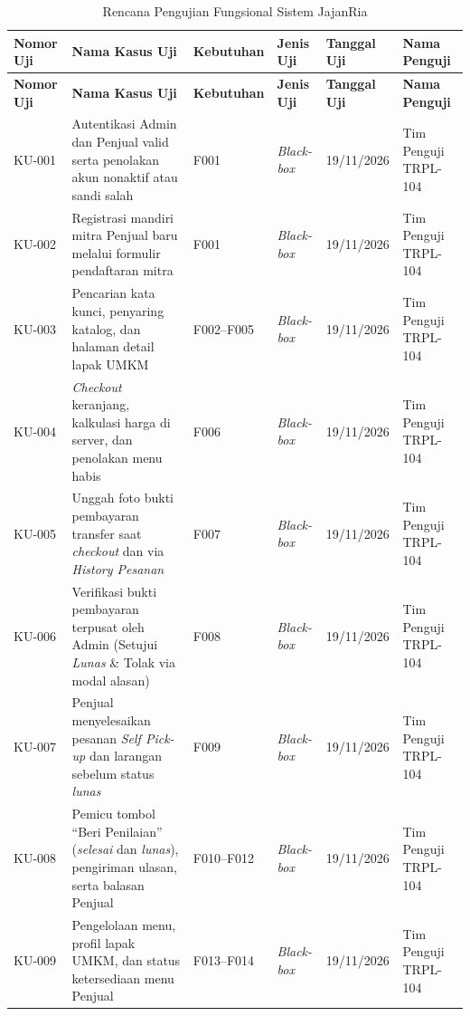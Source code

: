 \renewcommand{\arraystretch}{1.22}
\begin{longtable}{|C{1.55cm}|L{\dimexpr\textwidth-1.55cm-2.0cm-1.7cm-2.1cm-2.3cm-12\arrayrulewidth\relax}|C{2.0cm}|C{1.7cm}|C{2.1cm}|L{2.3cm}|}
\caption{Rencana Pengujian Fungsional Sistem JajanRia}
\label{tab:rencana-pengujian} \\
\hline
{}
\textbf{Nomor Uji} & \textbf{Nama Kasus Uji} & \textbf{Kebutuhan} & \textbf{Jenis Uji} & \textbf{Tanggal Uji} & \textbf{Nama Penguji} \\
\hline
\endfirsthead
\hline
{}
\textbf{Nomor Uji} & \textbf{Nama Kasus Uji} & \textbf{Kebutuhan} & \textbf{Jenis Uji} & \textbf{Tanggal Uji} & \textbf{Nama Penguji} \\
\hline
\endhead
\hline
\endfoot
KU-001 & Autentikasi Admin dan Penjual valid serta penolakan akun nonaktif atau sandi salah & F001 & \textit{Black-box} & 19/11/2026 & Tim Penguji TRPL-104 \\
\hline
KU-002 & Registrasi mandiri mitra Penjual baru melalui formulir pendaftaran mitra & F001 & \textit{Black-box} & 19/11/2026 & Tim Penguji TRPL-104 \\
\hline
KU-003 & Pencarian kata kunci, penyaring katalog, dan halaman detail lapak UMKM & F002--F005 & \textit{Black-box} & 19/11/2026 & Tim Penguji TRPL-104 \\
\hline
KU-004 & \textit{Checkout} keranjang, kalkulasi harga di server, dan penolakan menu habis & F006 & \textit{Black-box} & 19/11/2026 & Tim Penguji TRPL-104 \\
\hline
KU-005 & Unggah foto bukti pembayaran transfer saat \textit{checkout} dan via \textit{History Pesanan} & F007 & \textit{Black-box} & 19/11/2026 & Tim Penguji TRPL-104 \\
\hline
KU-006 & Verifikasi bukti pembayaran terpusat oleh Admin (Setujui \textit{Lunas} \& Tolak via modal alasan) & F008 & \textit{Black-box} & 19/11/2026 & Tim Penguji TRPL-104 \\
\hline
KU-007 & Penjual menyelesaikan pesanan \textit{Self Pick-up} dan larangan sebelum status \textit{lunas} & F009 & \textit{Black-box} & 19/11/2026 & Tim Penguji TRPL-104 \\
\hline
KU-008 & Pemicu tombol ``Beri Penilaian'' (\textit{selesai} dan \textit{lunas}), pengiriman ulasan, serta balasan Penjual & F010--F012 & \textit{Black-box} & 19/11/2026 & Tim Penguji TRPL-104 \\
\hline
KU-009 & Pengelolaan menu, profil lapak UMKM, dan status ketersediaan menu Penjual & F013--F014 & \textit{Black-box} & 19/11/2026 & Tim Penguji TRPL-104 \\

\end{longtable}

